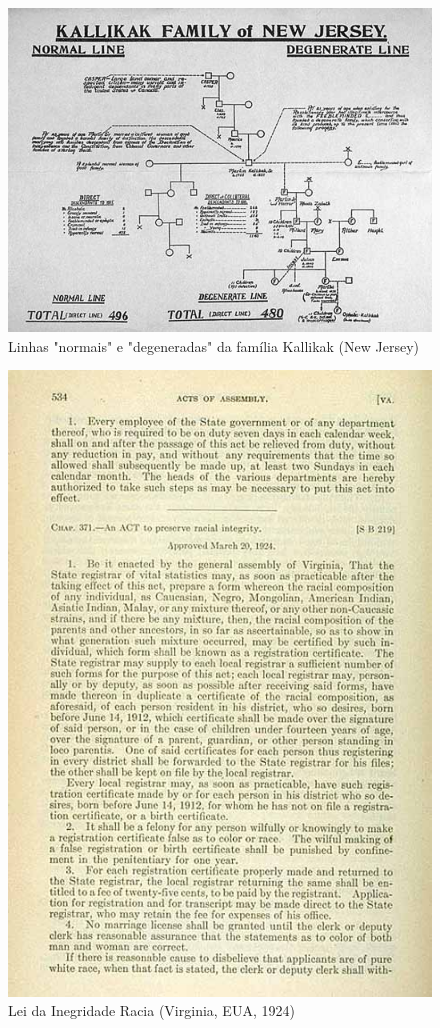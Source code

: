 \documentclass[
]{book}
\begin{document}
\begin{figure}

{\centering \includegraphics[width=0.75\linewidth]{images1/chart_Kallikak_pedigree2} 

}

\caption{Linhas "normais" e "degeneradas" da família Kallikak (New Jersey)}\label{fig:figA16}
\end{figure}

\hfill\break

\begin{figure}

{\centering \includegraphics[width=0.75\linewidth]{images1/VA_racial_integrity_act2} 

}

\caption{Lei da Inegridade Racia (Virginia, EUA, 1924)}\label{fig:figA17}
\end{figure}
\end{document}
